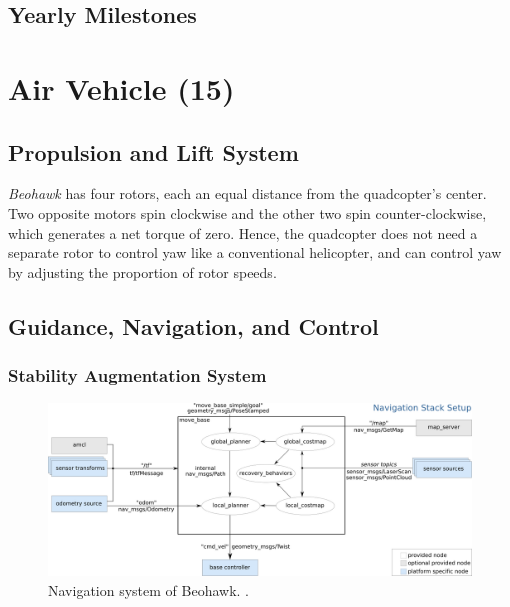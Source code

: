 \documentclass[12pt, letterpaper]{article}
\begin{document}
\subsection{Yearly Milestones}


\section{Air Vehicle (15)}

\subsection{Propulsion and Lift System}
\emph{Beohawk} has four rotors, each an equal distance from the quadcopter's center.  Two opposite motors spin clockwise and the other two spin counter-clockwise, which generates a net torque of zero.  Hence, the quadcopter does not need a separate rotor to control yaw like a conventional helicopter, and can control yaw by adjusting the proportion of rotor speeds.  

\subsection{Guidance, Navigation, and Control}

\subsubsection{Stability Augmentation System}

\begin{figure}[h]
\centering
\includegraphics[width=12cm]{images/overview_tf.png}
\caption{Navigation system of Beohawk. .} 
\label{fig:navi}
\end{figure}
\end{document}
